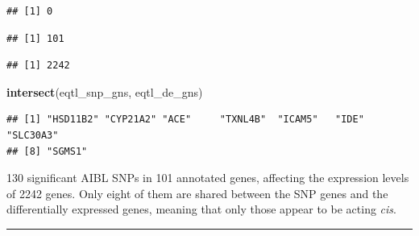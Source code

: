 \documentclass[]{article}
\newenvironment{Shaded}{\begin{snugshade}}{\end{snugshade}}
\newcommand{\KeywordTok}[1]{\textcolor[rgb]{0.13,0.29,0.53}{\textbf{#1}}}
\newcommand{\StringTok}[1]{\textcolor[rgb]{0.31,0.60,0.02}{#1}}
\newcommand{\CommentTok}[1]{\textcolor[rgb]{0.56,0.35,0.01}{\textit{#1}}}
\newcommand{\OperatorTok}[1]{\textcolor[rgb]{0.81,0.36,0.00}{\textbf{#1}}}
\newcommand{\NormalTok}[1]{#1}
\begin{document}
\begin{verbatim}
## [1] 0
\end{verbatim}

\begin{Shaded}
\end{Shaded}

\begin{verbatim}
## [1] 101
\end{verbatim}

\begin{Shaded}
\end{Shaded}

\begin{verbatim}
## [1] 2242
\end{verbatim}

\begin{Shaded}
\begin{Highlighting}[]
\KeywordTok{intersect}\NormalTok{(eqtl_snp_gns, eqtl_de_gns)}
\end{Highlighting}
\end{Shaded}

\begin{verbatim}
## [1] "HSD11B2" "CYP21A2" "ACE"     "TXNL4B"  "ICAM5"   "IDE"     "SLC30A3"
## [8] "SGMS1"
\end{verbatim}

130 significant AIBL SNPs in 101 annotated genes, affecting the
expression levels of 2242 genes. Only eight of them are shared between
the SNP genes and the differentially expressed genes, meaning that only
those appear to be acting \emph{cis}.

\begin{center}\rule{0.5\linewidth}{\linethickness}\end{center}
\end{document}
